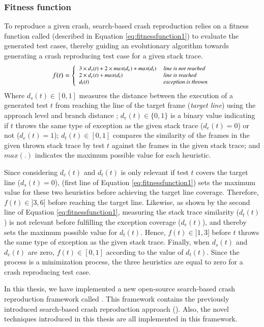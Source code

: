 \subsubsection{Fitness function}

To reproduce a given crash, search-based crash reproduction relies on a fitness function called \WS (described in Equation \ref{eq:fitnessfunction1}) to evaluate the generated test cases, thereby guiding an evolutionary algorithm towards generating a crash reproducing test case for a given stack trace.
%
\begin{equation} \label{eq:fitnessfunction1}
f(t) = 
\left\{
\footnotesize
  \begin{array}{ll}
    3 \times d_{s}(t) + 2 \times max(d_{e}) + max(d_{t})  & \textit{line is not reached}\\
    2 \times d_{e}(t) + max(d_{t})   & \textit{line is reached}\\
    d_{t}(t)  & \textit{exception is thrown}
  \end{array}
\right.
\end{equation}
%
Where $d_{s}(t) \in [0,1]$  measures the distance between the execution of a generated test $t$ from reaching the line of the target frame (\textit{target line}) using the approach level and branch distance \cite{McMinn2004}; $d_{e}(t) \in \{0,1\}$ is a binary value indicating if  $t$ throws the same type of exception as the given stack trace ($d_{e}(t) = 0$) or not ($d_{e}(t) = 1$); $d_{t}(t) \in [0,1]$ compares the similarity of the frames in the given thrown stack trace by test $t$ against the frames in the given stack trace; and $max(.)$ indicates the maximum possible value for each heuristic.

Since considering $d_{e}(t)$ and $d_{t}(t)$ is only relevant if test $t$ covers the target line ($d_{s}(t) = 0$), \WS (first line of Equation \ref{eq:fitnessfunction1}) sets the maximum value for these two heuristics before achieving the target line coverage. Therefore, $f(t) \in ]3,6]$ before reaching the target line. Likewise, as shown by the second line of Equation \ref{eq:fitnessfunction1}, measuring the stack trace similarity ($d_{t}(t)$) is not relevant before fulfilling the exception coverage ($d_{e}(t)$), and thereby \WS  sets the maximum possible value for $d_{t}(t)$. Hence, $f(t) \in ]1,3]$ before $t$ throws the same type of exception as the given stack trace. Finally, when $d_{s}(t)$ and $d_{e}(t)$ are zero, $f(t) \in [0,1]$ according to the value of $d_{t}(t)$. Since the process is a minimization process, the three heuristics are equal to zero for a crash reproducing test case.

In this thesis, we have implemented a new open-source search-based crash reproduction framework called \botsing. This framework contains the previously introduced search-based crash reproduction approach (\eg \evocrash). Also, the novel techniques introduced in this thesis are all implemented in this framework.
